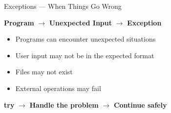 \begin{frame}{Exceptions — When Things Go Wrong}

    \begin{center}
        \Large
        \textbf{Program}
        $\longrightarrow$
        \textbf{Unexpected Input}
        $\longrightarrow$
        \textbf{Exception}
    \end{center}

    \vspace{0.8cm}

    \begin{itemize}
        \item Programs can encounter unexpected situations
        \item User input may not be in the expected format
        \item Files may not exist
        \item External operations may fail
    \end{itemize}

    \vfill

    \begin{center}
        \Large
        \textbf{try}
        $\rightarrow$
        \textbf{Handle the problem}
        $\rightarrow$
        \textbf{Continue safely}
    \end{center}

\end{frame}